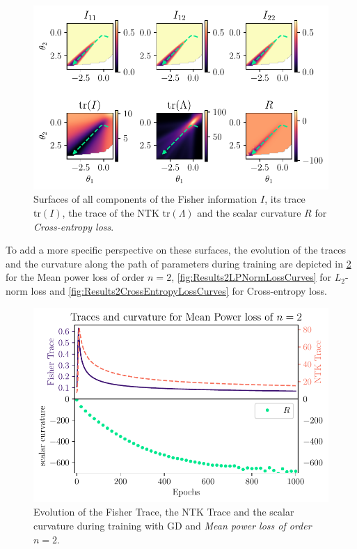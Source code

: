 \begin{figure}
	\centering
	\includegraphics{Experiment2/plots/CrossEntropyLoss_tracecomparison.pdf}
	\caption{Surfaces of all components of the Fisher information $I$, its trace $\mathrm{tr}(I)$, the trace of the NTK $\mathrm{tr}(\Lambda)$ and the scalar curvature $R$ for \emph{Cross-entropy loss}.}
	\label{fig:Results2CrossEntropyLoss}
\end{figure}
To add a more specific perspective on these surfaces, the evolution of the traces and the curvature along the path of parameters during training are depicted in \cref{fig:Results2MeanPowerLossCurves} for the Mean power loss of order $n=2$, \cref{fig:Results2LPNormLossCurves} for $L_2$-norm loss and \cref{fig:Results2CrossEntropyLossCurves} for Cross-entropy loss.\\
\begin{figure}
	\centering
	\includegraphics{Experiment2/plots/MeanPowerLoss2_Curves.pdf}
	\caption{Evolution of the Fisher Trace, the NTK Trace and the scalar curvature during training with GD and \emph{Mean power loss of order $n=2$}.}
	\label{fig:Results2MeanPowerLossCurves}
\end{figure}
